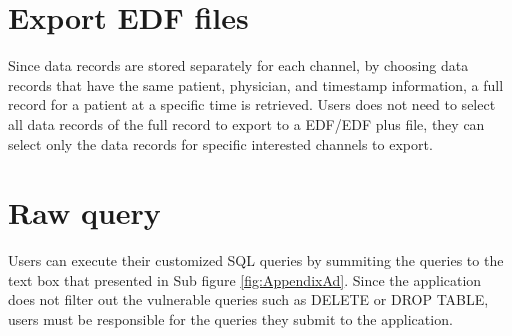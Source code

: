 \section{Export EDF files}
Since data records are stored separately for each channel, by choosing data records that have the same patient, physician, and timestamp information, a full record for a patient at a specific time is retrieved. Users does not need to select all data records of the full record to export to a EDF/EDF plus file, they can select only the data records for specific interested channels to export.
\section{Raw query}
Users can execute their customized SQL queries by summiting the queries to the text box that presented in Sub figure \ref{fig:AppendixAd}. Since the application does not filter out the vulnerable queries such as DELETE or DROP TABLE, users must be responsible for the queries they submit to the application.